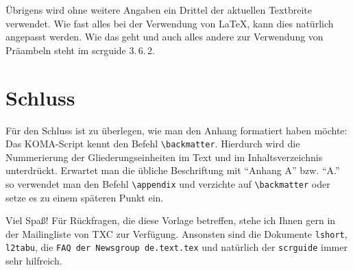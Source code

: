 \documentclass[a4paper,
openany,							%
toc=chapterentrywithdots
]
{scrbook}
\begin{document}
Übrigens wird ohne weitere Angaben ein Drittel der aktuellen Textbreite verwendet. Wie fast alles bei der Verwendung von \LaTeX , kann dies natürlich angepasst werden. Wie das geht und auch alles andere zur Verwendung von Präambeln steht im scrguide 3.\,6.\,2.


\appendix							%
\chapter{Schluss}

Für den Schluss ist zu überlegen, wie man den Anhang formatiert haben möchte: Das KOMA-Script kennt den Befehl \verb#\backmatter#. Hierdurch wird die Nummerierung der Gliederungseinheiten im Text und im Inhaltsverzeichnis unterdrückt. Erwartet man die übliche Beschriftung mit "`Anhang A"' bzw. "`A."' so verwendet man den Befehl \verb#\appendix# und verzichte auf \verb#\backmatter# oder setze es zu einem späteren Punkt ein.

Viel Spaß! Für Rückfragen, die diese Vorlage betreffen, stehe ich Ihnen gern in der Mailingliste von TXC zur Verfügung. Ansonsten sind die Dokumente \texttt{lshort}, \texttt{l2tabu}, die \texttt{FAQ der Newsgroup de.text.tex} und natürlich der \texttt{scrguide} immer sehr hilfreich.


%
\end{document}
